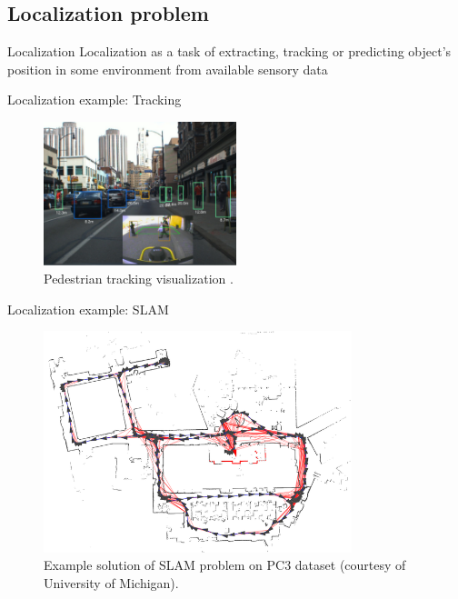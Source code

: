 \documentclass[pdftex, handout]{beamer}
\begin{document}
\subsection{Localization problem}

\begin{frame}{Localization}
  Localization as a task of extracting, tracking or predicting object's position in some environment from available sensory data
\end{frame}

\begin{frame}{Localization example: Tracking}
  \begin{figure}
  \includegraphics[width=0.5\textwidth,height=0.5\textheight,keepaspectratio]{images/tracking.png}
\caption{Pedestrian tracking visualization \footnotemark.}
\end{figure}

\end{frame}

\begin{frame}[noframenumbering]{Localization example: SLAM}
  \begin{figure}
  \includegraphics[width=0.8\textwidth,height=0.7\textheight,keepaspectratio]{images/slam.png}
\caption{Example solution of SLAM problem on PC3 dataset (courtesy of University of Michigan).}
\end{figure}
\end{frame}
\end{document}
